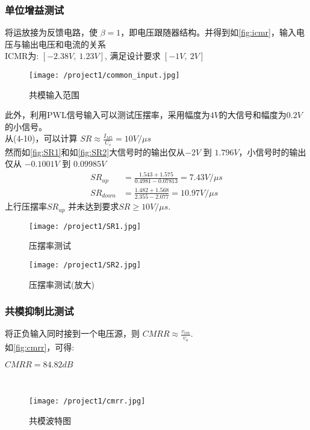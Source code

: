     \subsubsection{单位增益测试}
    将运放接为反馈电路，使 $ \beta = 1 $，即电压跟随器结构。并得到如\autoref{fig:icmr}，输入电压与输出电压和电流的关系\\
    \indent ICMR为: $ [-2.38V,\ 1.23V] $, 满足设计要求 $ [-1V,\ 2V] $ \\
    \begin{figure}[H]
        \centering
        \texttt{[image: /project1/common\_input.jpg]}
        \caption{\label{fig:icmr}共模输入范围}
    \end{figure}
    \indent 此外，利用PWL信号输入可以测试压摆率，采用幅度为$ 4V $的大信号和幅度为$ 0.2V $的小信号。 \\
    \indent 从(4-10)，可以计算 $ SR \approx \frac{I_{M5}}{C_c} = 10V/\mu s $ \\
    \indent 然而如\autoref{fig:SR1}和如\autoref{fig:SR2}大信号时的输出仅从$ -2V $ 到 $ 1.796V $，小信号时的输出仅从 $ -0.1001V $ 到 $ 0.09985V $ 
    \begin{align}
        SR_{up} & = \frac{1.543+1.575}{0.4981-0.07813} = 7.43V/\mu s \\
        SR_{down} & = \frac{1.482+1.568}{2.355-2.077} = 10.97V/\mu s 
    \end{align}
    \indent 上行压摆率$ SR_{up} $ 并未达到要求$ SR \geq 10V/\mu s $. \\
    \begin{figure}[H]
        \centering
        \texttt{[image: /project1/SR1.jpg]}
        \caption{\label{fig:SR1}压摆率测试}
    \end{figure}
    \begin{figure}[H]
        \centering
        \texttt{[image: /project1/SR2.jpg]} \\
        \caption{\label{fig:SR2}压摆率测试(放大)}
    \end{figure}
    \subsubsection{共模抑制比测试}
    将正负输入同时接到一个电压源，则 $ CMRR \approx \frac{v_{cm}}{v_o} $. \\
    \indent 如\autoref{fig:cmrr}，可得: \\
    \centerline{$ CMRR = 84.82dB $} \\
    \begin{figure}[H]
        \centering
        \texttt{[image: /project1/cmrr.jpg]}
        \caption{\label{fig:cmrr}共模波特图}
    \end{figure}

